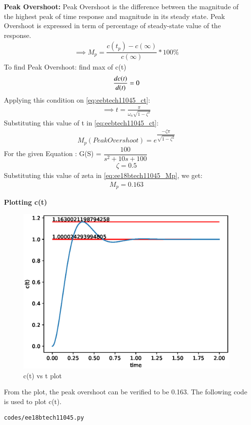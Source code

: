 \begin{enumerate}[label=\thesubsection.\arabic*.,ref=\thesubsection.\theenumi]
 \textbf{Peak Overshoot:}
 Peak Overshoot is the difference between the magnitude of the highest peak of time response and magnitude in its steady state. Peak Overshoot is expressed in term of percentage of steady-state value of the response.
\begin{align}
    \implies M_p = \dfrac{c(t_p) - c(\infty)}{c(\infty)} * 100 \%
\end{align}
To find Peak Overshoot: find max of c(t)
\begin{align}
    \frac{dc(\emph{t})}{d(\emph{t})} = 0
\end{align}
Applying this condition on \eqref{eq:eebtech11045_ct}:
\begin{align}
    \implies t = \frac{\pi}{\omega_n\sqrt{1-\zeta^2}}
\end{align}
Substituting this value of t in \eqref{eq:eebtech11045_ct}:
\begin{align}
    M_p (PeakOvershoot) = e^{\dfrac{-\zeta\pi}{\sqrt{1-\zeta^2}}}
    \label{eq:ee18btech11045_Mp}
\end{align}
For the given Equation : G(S) = $\dfrac{100}{s^2 + 10s +100}$
\begin{align}
    \zeta = 0.5
\end{align}
Substituting this value of zeta in \eqref{eq:ee18btech11045_Mp}, we get:
\begin{align}
     M_p = 0.163
\end{align}

\textbf{Plotting c(t)}
\begin{figure}[!h]
    \centering
    \includegraphics[width=\columnwidth]{./figs/ee18btech11045/ee18btech11045.eps}
    \caption{c(t) vs t plot}
    \label{fig:ee18btech11045_plot} 
\end{figure}
From the plot, the peak overshoot can be verified to be 0.163.
The following code is used to plot c(t).
\begin{lstlisting}
codes/ee18btech11045.py
\end{lstlisting}
\end{enumerate}